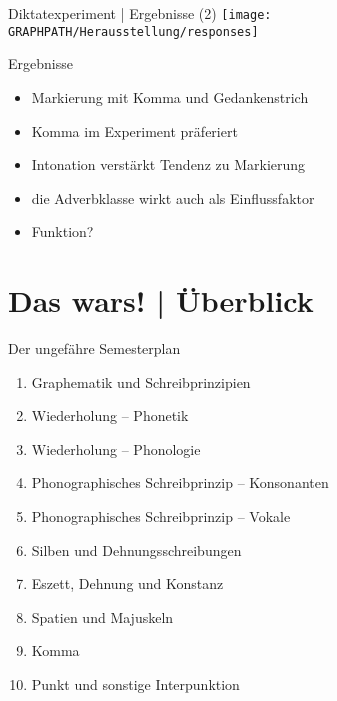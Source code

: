 \begin{frame}
  {Diktatexperiment | Ergebnisse (2)}
  \centering 
  \texttt{[image: \\GRAPHPATH/Herausstellung/responses]}
\end{frame}


\begin{frame}
  {Ergebnisse}
  \begin{itemize}[<+->]
    \item Markierung mit Komma und Gedankenstrich
    \item Komma im Experiment präferiert\\
      \Halbzeile
    \item Intonation verstärkt Tendenz zu Markierung
    \item die Adverbklasse wirkt auch als Einflussfaktor
      \Halbzeile
    \item Funktion?
  \end{itemize}
\end{frame}

\ifdefined\TITLE
  \section{Das wars! | Überblick}

  \begin{frame}
    {Der ungefähre Semesterplan}
    \begin{enumerate}[<+->]
      \item Graphematik und Schreibprinzipien
      \item Wiederholung -- Phonetik
      \item Wiederholung -- Phonologie
      \item Phonographisches Schreibprinzip -- Konsonanten
      \item Phonographisches Schreibprinzip -- Vokale
      \item Silben und Dehnungsschreibungen
      \item Eszett, Dehnung und Konstanz
      \item Spatien und Majuskeln
      \item Komma
      \item \alert{Punkt und sonstige Interpunktion}
    \end{enumerate}
  \end{frame}
\fi
